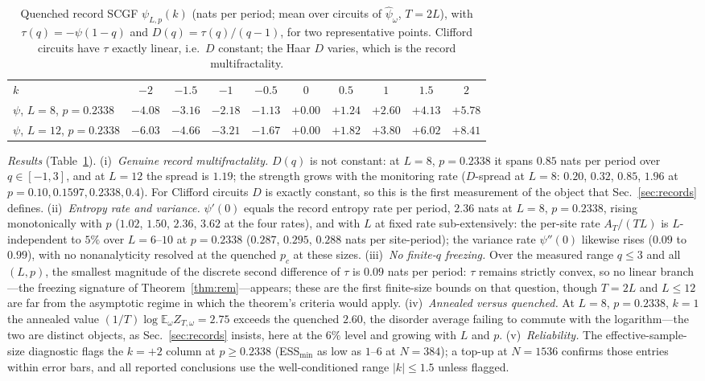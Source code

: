 \documentclass[aps,prx,reprint,superscriptaddress,nobibnotes,longbibliography]{revtex4-2}
\theoremstyle{remark}
\newcommand{\E}{\mathbb E}
\begin{document}
\begin{table}[t]
\caption{Quenched record SCGF $\psi_{L,p}(k)$ (nats per period; mean over circuits of $\widehat\psi_\omega$, $T=2L$), with $\tau(q)=-\psi(1-q)$ and $D(q)=\tau(q)/(q-1)$, for two representative points.  Clifford circuits have $\tau$ exactly linear, i.e.\ $D$ constant; the Haar $D$ varies, which is the record multifractality.}
\label{tab:smchaar}
\begin{ruledtabular}
\begin{tabular}{lccccccccc}
$k$ & $-2$ & $-1.5$ & $-1$ & $-0.5$ & $0$ & $0.5$ & $1$ & $1.5$ & $2$ \\
\colrule
$\psi$, $L=8$, $p=0.2338$ & $-4.08$ & $-3.16$ & $-2.18$ & $-1.13$ & $+0.00$ & $+1.24$ & $+2.60$ & $+4.13$ & $+5.78$ \\
$\psi$, $L=12$, $p=0.2338$ & $-6.03$ & $-4.66$ & $-3.21$ & $-1.67$ & $+0.00$ & $+1.82$ & $+3.80$ & $+6.02$ & $+8.41$ \\
\end{tabular}
\end{ruledtabular}
\end{table}

\emph{Results} (Table~\ref{tab:smchaar}).  (i)~\emph{Genuine record multifractality.}  $D(q)$ is not constant: at $L=8$, $p=0.2338$ it spans $0.85$ nats per period over $q\in[-1,3]$, and at $L=12$ the spread is $1.19$; the strength grows with the monitoring rate ($D$-spread at $L=8$: $0.20$, $0.32$, $0.85$, $1.96$ at $p=0.10,0.1597,0.2338,0.4$).  For Clifford circuits $D$ is exactly constant, so this is the first measurement of the object that Sec.~\ref{sec:records} defines.  (ii)~\emph{Entropy rate and variance.}  $\psi'(0)$ equals the record entropy rate per period, $2.36$ nats at $L=8$, $p=0.2338$, rising monotonically with $p$ ($1.02$, $1.50$, $2.36$, $3.62$ at the four rates), and with $L$ at fixed rate sub-extensively: the per-site rate $A_T/(TL)$ is $L$-independent to $5\%$ over $L=6$--$10$ at $p=0.2338$ ($0.287$, $0.295$, $0.288$ nats per site-period); the variance rate $\psi''(0)$ likewise rises ($0.09$ to $0.99$), with no nonanalyticity resolved at the quenched $p_c$ at these sizes.  (iii)~\emph{No finite-$q$ freezing.}  Over the measured range $q\le3$ and all $(L,p)$, the smallest magnitude of the discrete second difference of $\tau$ is $0.09$ nats per period: $\tau$ remains strictly convex, so no linear branch---the freezing signature of Theorem~\ref{thm:rem}---appears; these are the first finite-size bounds on that question, though $T=2L$ and $L\le12$ are far from the asymptotic regime in which the theorem's criteria would apply.  (iv)~\emph{Annealed versus quenched.}  At $L=8$, $p=0.2338$, $k=1$ the annealed value $(1/T)\log\E_\omega Z_{T,\omega}=2.75$ exceeds the quenched $2.60$, the disorder average failing to commute with the logarithm---the two are distinct objects, as Sec.~\ref{sec:records} insists, here at the $6\%$ level and growing with $L$ and $p$.  (v)~\emph{Reliability.}  The effective-sample-size diagnostic flags the $k=+2$ column at $p\ge0.2338$ (ESS$_{\min}$ as low as $1$--$6$ at $N=384$); a top-up at $N=1536$ confirms those entries within error bars, and all reported conclusions use the well-conditioned range $|k|\le1.5$ unless flagged.
\end{document}
